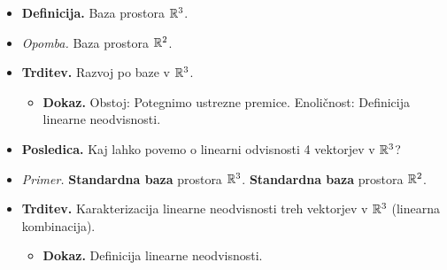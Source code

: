 \begin{enumerate}
\begin{itemize}
        \item \colorbox{purple!30}{\textbf{Definicija.}} Baza prostora $\mathbb{R}^3$.
        \item \colorbox{yellow!30}{\emph{Opomba.}} Baza prostora $\mathbb{R}^2$.
        \item \colorbox{blue!30}{\textbf{Trditev.}} Razvoj po baze v $\mathbb{R}^3$. 
        \begin{itemize}
            \item \colorbox{green!30}{\textbf{Dokaz.}} Obstoj: Potegnimo ustrezne premice.            
            Enoličnost: Definicija linearne neodvisnosti.
        \end{itemize}
        \item \colorbox{orange!30}{\textbf{Posledica.}} Kaj lahko povemo o linearni odvisnosti 4 vektorjev v $\mathbb{R}^3$?
        \item \colorbox{yellow!30}{\emph{Primer.}} \textbf{Standardna baza} prostora $\mathbb{R}^3$. \textbf{Standardna baza} prostora $\mathbb{R}^2$. 
        \item \colorbox{blue!30}{\textbf{Trditev.}} Karakterizacija linearne neodvisnosti treh vektorjev v $\mathbb{R}^3$ (linearna kombinacija).
        \begin{itemize}
            \item \colorbox{green!30}{\textbf{Dokaz.}} Definicija linearne neodvisnosti.
        \end{itemize}
    \end{itemize}


\end{enumerate}

